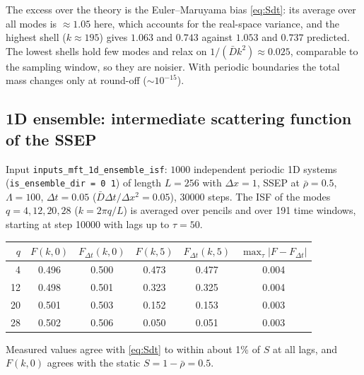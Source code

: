 \documentclass[11pt]{article}
\newcommand{\code}[1]{\texttt{#1}}
\begin{document}
\noindent The excess over the theory is the Euler--Maruyama bias
\eqref{eq:Sdt}: its average over all modes is $\approx1.05$ here, which
accounts for the real-space variance, and the highest shell
($k\approx195$) gives $1.063$ and $0.743$ against $1.053$ and $0.737$
predicted. The lowest shells hold few modes and relax on
$1/(\bar D k^2)\approx0.025$, comparable to the sampling window, so they
are noisier. With periodic boundaries the total mass changes only at
round-off ($\sim10^{-15}$).

\subsection{1D ensemble: intermediate scattering function of the SSEP}

Input \code{inputs\_mft\_1d\_ensemble\_isf}: $1000$ independent periodic 1D
systems (\code{is\_ensemble\_dir = 0 1}) of length $L=256$ with
$\Delta x=1$, SSEP at $\bar\rho=0.5$, $\Lambda=100$,
$\Delta t = 0.05$ ($\bar D\Delta t/\Delta x^2=0.05$), 30000 steps. The ISF
of the modes $q=4,12,20,28$ ($k=2\pi q/L$) is averaged over pencils and
over 191 time windows, starting at step 10000 with lags up to $\tau=50$.

\begin{center}
\begin{tabular}{rccccc}
\toprule
$q$ & $F(k,0)$ & $F_{\Delta t}(k,0)$ & $F(k,5)$ & $F_{\Delta t}(k,5)$ & $\max_\tau|F-F_{\Delta t}|$ \\
\midrule
 4 & 0.496 & 0.500 & 0.473 & 0.477 & 0.004 \\
12 & 0.498 & 0.501 & 0.323 & 0.325 & 0.004 \\
20 & 0.501 & 0.503 & 0.152 & 0.153 & 0.003 \\
28 & 0.502 & 0.506 & 0.050 & 0.051 & 0.003 \\
\bottomrule
\end{tabular}
\end{center}

\noindent Measured values agree with \eqref{eq:Sdt} to within about 1\% of
$S$ at all lags, and $F(k,0)$ agrees with the static $S=1-\bar\rho=0.5$.
\end{document}
